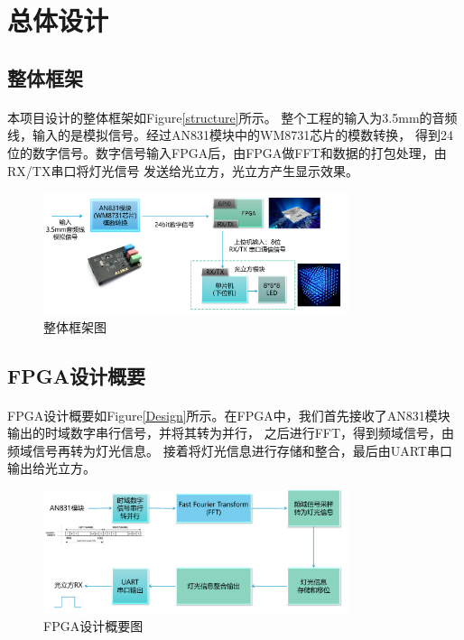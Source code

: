 \documentclass[12pt]{article}
\begin{document}
\section{总体设计}
\subsection{整体框架}
\paragraph{}本项目设计的整体框架如Figure\eqref{structure}所示。 
整个工程的输入为3.5mm的音频线，输入的是模拟信号。经过AN831模块中的WM8731芯片的模数转换，
得到24位的数字信号。数字信号输入FPGA后，由FPGA做FFT和数据的打包处理，由RX/TX串口将灯光信号
发送给光立方，光立方产生显示效果。


\begin{figure}[h]
    \centering
    \label{structure}
        \includegraphics[width=0.8\textwidth]{./pic/structure.png}
        \caption{整体框架图}
\end{figure}

\clearpage
\subsection{FPGA设计概要}
\paragraph{}
FPGA设计概要如Figure\eqref{Design}所示。在FPGA中，我们首先接收了AN831模块输出的时域数字串行信号，并将其转为并行，
之后进行FFT，得到频域信号，由频域信号再转为灯光信息。
接着将灯光信息进行存储和整合，最后由UART串口输出给光立方。

\begin{figure}[h]
    \centering
    \label{Design}
        \includegraphics[width=0.8\textwidth]{./pic/Design.png}
        \caption{FPGA设计概要图}
\end{figure}
\end{document}
